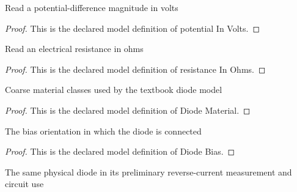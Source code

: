 \begin{definition}
  \label{def:physics:phyx-mini-0572:phyxminiproblems-problemphyxmini0572-potentialinvolts}
  Read a potential-difference magnitude in volts
\end{definition}
\begin{proof}
  This is the declared model definition of potential In Volts.
\end{proof}
\begin{definition}
  \label{def:physics:phyx-mini-0572:phyxminiproblems-problemphyxmini0572-resistanceinohms}
  Read an electrical resistance in ohms
\end{definition}
\begin{proof}
  This is the declared model definition of resistance In Ohms.
\end{proof}
\begin{definition}
  \label{def:physics:phyx-mini-0572:phyxminiproblems-problemphyxmini0572-diodematerial}
  Coarse material classes used by the textbook diode model
\end{definition}
\begin{proof}
  This is the declared model definition of Diode Material.
\end{proof}
\begin{definition}
  \label{def:physics:phyx-mini-0572:phyxminiproblems-problemphyxmini0572-diodebias}
  The bias orientation in which the diode is connected
\end{definition}
\begin{proof}
  This is the declared model definition of Diode Bias.
\end{proof}
\begin{definition}[Diode]
  \label{def:physics:phyx-mini-0572:phyxminiproblems-problemphyxmini0572-diode}
  The same physical diode in its preliminary reverse-current measurement and circuit use
\end{definition}
